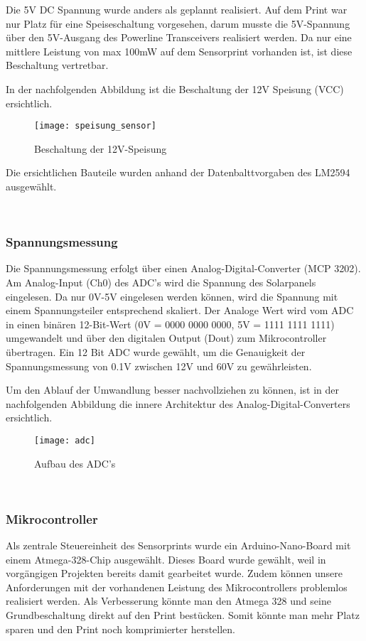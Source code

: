 Die 5V DC Spannung wurde anders als geplannt realisiert. Auf dem Print war nur Platz für eine Speiseschaltung vorgesehen, darum musste die 5V-Spannung über den 5V-Ausgang des Powerline Transceivers realisiert werden. Da nur eine mittlere Leistung von max 100mW auf dem Sensorprint vorhanden ist, ist diese Beschaltung vertretbar.

In der nachfolgenden Abbildung ist die Beschaltung der 12V Speisung (VCC) ersichtlich.


\begin{figure}[h]
\centering
\texttt{[image: speisung\_sensor]}
\caption{Beschaltung der 12V-Speisung}
\end{figure}

Die ersichtlichen Bauteile wurden anhand der Datenbalttvorgaben des LM2594 ausgewählt.

\
\
\subsubsection{Spannungsmessung}
Die Spannungsmessung erfolgt über einen Analog-Digital-Converter (MCP 3202). Am Analog-Input (Ch0) des ADC's wird die Spannung des Solarpanels eingelesen. Da nur 0V-5V eingelesen werden können, wird die Spannung mit einem Spannungsteiler entsprechend skaliert. Der Analoge Wert wird vom ADC in einen binären 12-Bit-Wert (0V = 0000 0000 0000, 5V = 1111 1111 1111) umgewandelt und über den digitalen Output (Dout) zum Mikrocontroller übertragen. Ein 12 Bit ADC wurde gewählt, um die Genauigkeit der Spannungsmessung von 0.1V zwischen 12V und 60V zu gewährleisten.

Um den Ablauf der Umwandlung besser nachvollziehen zu können, ist in der nachfolgenden Abbildung die innere Architektur des Analog-Digital-Converters ersichtlich.

\clearpage
\begin{figure}[h]
\centering
\texttt{[image: adc]}
\caption{Aufbau des ADC's \cite{Datasheet_adc}}
\end{figure}

\
\

\subsubsection{Mikrocontroller}
Als zentrale Steuereinheit des Sensorprints wurde ein Arduino-Nano-Board mit einem Atmega-328-Chip ausgewählt. Dieses Board wurde gewählt, weil in vorgängigen Projekten bereits damit gearbeitet wurde. Zudem können unsere Anforderungen mit der vorhandenen Leistung des Mikrocontrollers problemlos realisiert werden. Als Verbesserung könnte man den Atmega 328 und seine Grundbeschaltung direkt auf den Print bestücken. Somit könnte man mehr Platz sparen und den Print noch komprimierter herstellen.


